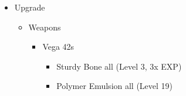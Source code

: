 \begin{upgrade}
  \begin{itemize}
    \item Upgrade
          \begin{itemize}
            \item Weapons
                  \begin{itemize}
                    \item Vega 42s
                          \begin{itemize}
                            \item Sturdy Bone all (Level 3, 3x EXP)
                            \item Polymer Emulsion all (Level 19)
                          \end{itemize}
                  \end{itemize}
          \end{itemize}
  \end{itemize}
\end{upgrade}

